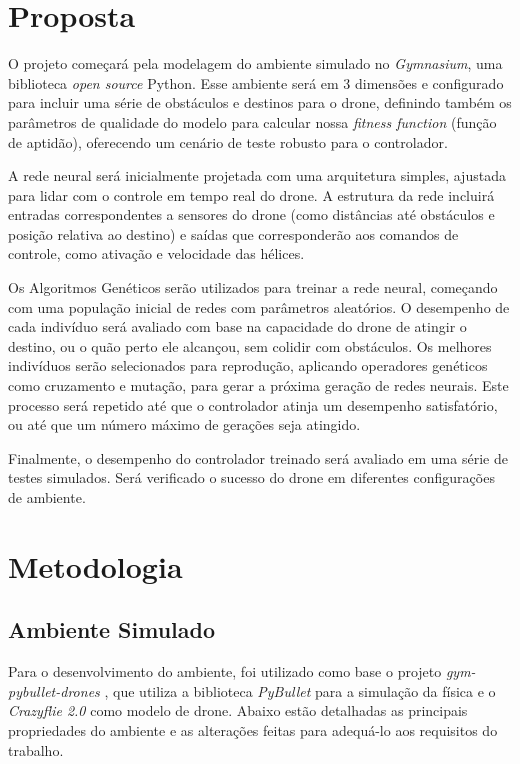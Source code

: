 \documentclass[12pt]{article}
\begin{document}
\section{Proposta}
O projeto começará pela modelagem do ambiente simulado no \textit{Gymnasium}, uma biblioteca \textit{open source} Python. Esse ambiente será em 3 dimensões e configurado para incluir uma série de obstáculos e destinos para o drone, definindo também os parâmetros de qualidade do modelo para calcular nossa \textit{fitness function} (função de aptidão), oferecendo um cenário de teste robusto para o controlador.

A rede neural será inicialmente projetada com uma arquitetura simples, ajustada para lidar com o controle em tempo real do drone. A estrutura da rede incluirá entradas correspondentes a sensores do drone (como distâncias até obstáculos e posição relativa ao destino) e saídas que corresponderão aos comandos de controle, como ativação e velocidade das hélices.

Os Algoritmos Genéticos serão utilizados para treinar a rede neural, começando com uma população inicial de redes com parâmetros aleatórios. O desempenho de cada indivíduo será avaliado com base na capacidade do drone de atingir o destino, ou o quão perto ele alcançou, sem colidir com obstáculos. Os melhores indivíduos serão selecionados para reprodução, aplicando operadores genéticos como cruzamento e mutação, para gerar a próxima geração de redes neurais. Este processo será repetido até que o controlador atinja um desempenho satisfatório, ou até que um número máximo de gerações seja atingido.

Finalmente, o desempenho do controlador treinado será avaliado em uma série de testes simulados. Será verificado o sucesso do drone em diferentes configurações de ambiente.%

\section{Metodologia}
\subsection{Ambiente Simulado}
Para o desenvolvimento do ambiente, foi utilizado como base o projeto \textit{gym-pybullet-drones} \cite{panerati2021learning}, que utiliza a biblioteca \textit{PyBullet}\cite{coumans2019} para a simulação da física e o \textit{Crazyflie 2.0} \cite{forster2015system} como modelo de drone. Abaixo estão detalhadas as principais propriedades do ambiente e as alterações feitas para adequá-lo aos requisitos do trabalho.
\end{document}

